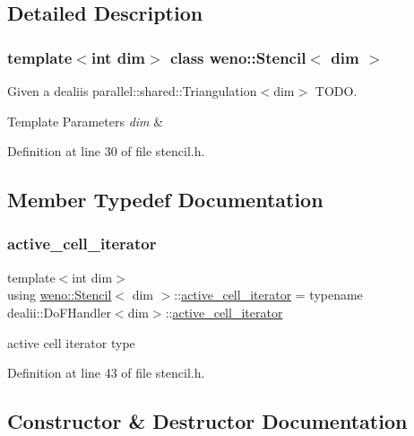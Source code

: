 \subsection{Detailed Description}
\subsubsection*{template$<$int dim$>$\newline
class weno\+::\+Stencil$<$ dim $>$}

Given a dealii\textquotesingle{}s parallel\+::shared\+::\+Triangulation$<$dim$>$ T\+O\+DO. 


\begin{DoxyTemplParams}{Template Parameters}
{\em dim} & \\
\hline
\end{DoxyTemplParams}


Definition at line 30 of file stencil.\+h.



\subsection{Member Typedef Documentation}
\mbox{\label{classweno_1_1_stencil_a5a730ad61bd5e9c36a86ccb36578f42c}} 
\subsubsection{\texorpdfstring{active\+\_\+cell\+\_\+iterator}{active\_cell\_iterator}}
{\footnotesize\ttfamily template$<$int dim$>$ \\
using \hyperlink{classweno_1_1_stencil}{weno\+::\+Stencil}$<$ dim $>$\+::\hyperlink{classweno_1_1_stencil_a5a730ad61bd5e9c36a86ccb36578f42c}{active\+\_\+cell\+\_\+iterator} =  typename dealii\+::\+Do\+F\+Handler$<$dim$>$\+::\hyperlink{classweno_1_1_stencil_a5a730ad61bd5e9c36a86ccb36578f42c}{active\+\_\+cell\+\_\+iterator}}



active cell iterator type 



Definition at line 43 of file stencil.\+h.



\subsection{Constructor \& Destructor Documentation}
\mbox{\label{classweno_1_1_stencil_af48d0944ac3bb69eb6dfbcd5a0c98b5c}} 

